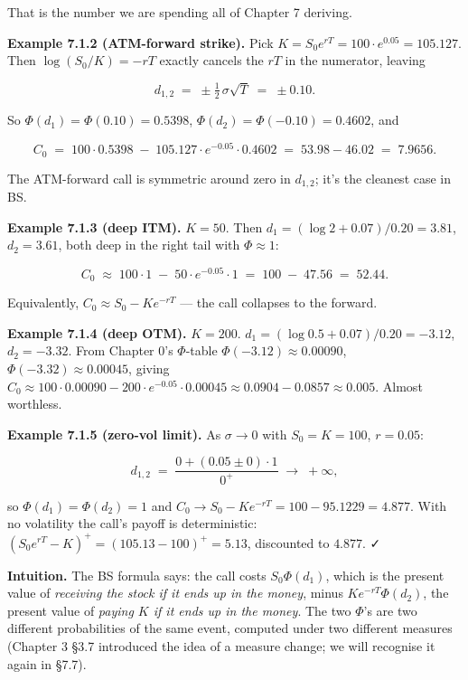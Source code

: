 \documentclass[
  10pt,
  twoside]{book}
\begin{document}
That is the number we are spending all of Chapter 7 deriving.

\textbf{Example 7.1.2 (ATM-forward strike).} Pick
\(K = S_0 e^{rT} = 100 \cdot e^{0.05} = 105.127\). Then
\(\log(S_0/K) = -rT\) exactly cancels the \(rT\) in the numerator,
leaving

\[d_{1,2} \;=\; \pm \tfrac{1}{2}\,\sigma\sqrt T \;=\; \pm 0.10.\]

So \(\Phi(d_1) = \Phi(0.10) = 0.5398\),
\(\Phi(d_2) = \Phi(-0.10) = 0.4602\), and

\[C_0 \;=\; 100 \cdot 0.5398 \;-\; 105.127 \cdot e^{-0.05} \cdot 0.4602 \;=\; 53.98 - 46.02 \;=\; 7.9656.\]

The ATM-forward call is symmetric around zero in \(d_{1,2}\); it's the
cleanest case in BS.

\textbf{Example 7.1.3 (deep ITM).} \(K = 50\). Then
\(d_1 = (\log 2 + 0.07)/0.20 = 3.81\), \(d_2 = 3.61\), both deep in the
right tail with \(\Phi \approx 1\):

\[C_0 \;\approx\; 100 \cdot 1 \;-\; 50 \cdot e^{-0.05} \cdot 1 \;=\; 100 \;-\; 47.56 \;=\; 52.44.\]

Equivalently, \(C_0 \approx S_0 - K e^{-rT}\) --- the call collapses to
the forward.

\textbf{Example 7.1.4 (deep OTM).} \(K = 200\).
\(d_1 = (\log 0.5 + 0.07)/0.20 = -3.12\), \(d_2 = -3.32\). From Chapter
0's \(\Phi\)-table \(\Phi(-3.12) \approx 0.00090\),
\(\Phi(-3.32) \approx 0.00045\), giving
\(C_0 \approx 100 \cdot 0.00090 - 200 \cdot e^{-0.05} \cdot 0.00045 \approx 0.0904 - 0.0857 \approx 0.005\).
Almost worthless.

\textbf{Example 7.1.5 (zero-vol limit).} As \(\sigma \to 0\) with
\(S_0 = K = 100\), \(r = 0.05\):

\[d_{1,2} \;=\; \frac{0 + (0.05 \pm 0)\cdot 1}{0^+} \;\to\; +\infty,\]

so \(\Phi(d_1) = \Phi(d_2) = 1\) and
\(C_0 \to S_0 - K e^{-rT} = 100 - 95.1229 = 4.877\). With no volatility
the call's payoff is deterministic:
\((S_0 e^{rT} - K)^+ = (105.13 - 100)^+ = 5.13\), discounted to
\(4.877\). ✓

\textbf{Intuition.} The BS formula says: the call costs
\(S_0 \Phi(d_1)\), which is the present value of \emph{receiving the
stock if it ends up in the money}, minus \(K e^{-rT} \Phi(d_2)\), the
present value of \emph{paying \(K\) if it ends up in the money}. The two
\(\Phi\)'s are two different probabilities of the same event, computed
under two different measures (Chapter 3 §3.7 introduced the idea of a
measure change; we will recognise it again in §7.7).
\end{document}
